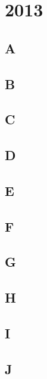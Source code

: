\section{2013}
\subsection{A}
\raggedbottom
\hrulefill
\subsection{B}
\raggedbottom
\hrulefill
\subsection{C}
\raggedbottom
\hrulefill
\subsection{D}
\raggedbottom
\hrulefill
\subsection{E}
\raggedbottom
\hrulefill
\subsection{F}
\raggedbottom
\hrulefill
\subsection{G}
\raggedbottom
\hrulefill
\subsection{H}
\raggedbottom
\hrulefill
\subsection{I}
\raggedbottom
\hrulefill
\subsection{J}
\raggedbottom
\hrulefill

